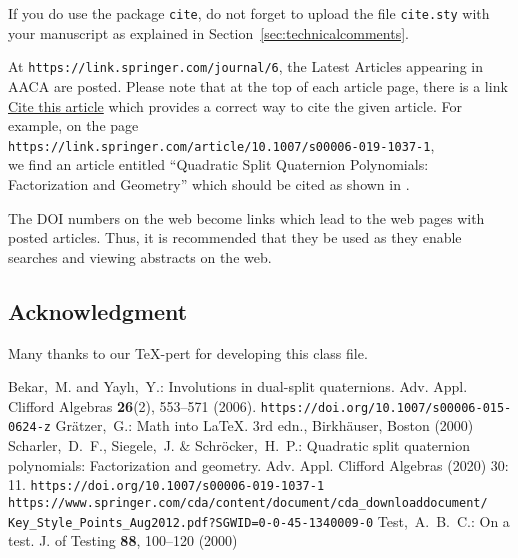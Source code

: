 \documentclass{birkjour}
\theoremstyle{definition}
\theoremstyle{remark}
\numberwithin{equation}{section}
\begin{document}
If you do use the package \verb+cite+, do not forget to upload the file \verb+cite.sty+ with your manuscript as explained in Section~\ref{sec:technicalcomments}.

At \texttt{https://link.springer.com/journal/6}, the Latest Articles appearing in AACA are posted.  Please note that at the top of each article page, there is a link \underline{Cite this article} which provides a correct way to cite the given article. For example, on the page\\

\texttt{https://link.springer.com/article/10.1007/s00006-019-1037-1},\\

\noindent
we find an article entitled ``Quadratic Split Quaternion Polynomials: Factorization and Geometry'' which should be cited as shown in \cite{scharler}.

The DOI numbers on the web become links which lead to the web pages with posted articles. Thus, it is recommended that they be used as they enable searches and viewing abstracts on the web.



\subsection*{Acknowledgment}
Many thanks to our \TeX-pert for developing this class file.


\begin{thebibliography}{1}
Bekar,~M. and Yayl{\i},~Y.: Involutions in dual-split quaternions. Adv. Appl. Clifford Algebras \textbf{26}(2), 553--571 (2006). 
\texttt{https://doi.org/10.1007/s00006-015-0624-z}
Gr\"atzer,~G.: Math into \LaTeX. 3rd edn., Birkh\"auser, Boston (2000)
Scharler,~D.~F., Siegele,~J. \& Schr\"{o}cker,~H.~P.: Quadratic split quaternion polynomials: Factorization and geometry. Adv. Appl. Clifford Algebras (2020) 30: 11. \texttt{https://doi.org/10.1007/s00006-019-1037-1}
\texttt{\small https://www.springer.com/cda/content/document/cda\_downloaddocument/ \newline Key\_Style\_Points\_Aug2012.pdf?SGWID=0-0-45-1340009-0}
 Test,~A.~B.~C.: On a test. J. of Testing \textbf{88}, 100--120 (2000)
\end{thebibliography}

\end{document}
